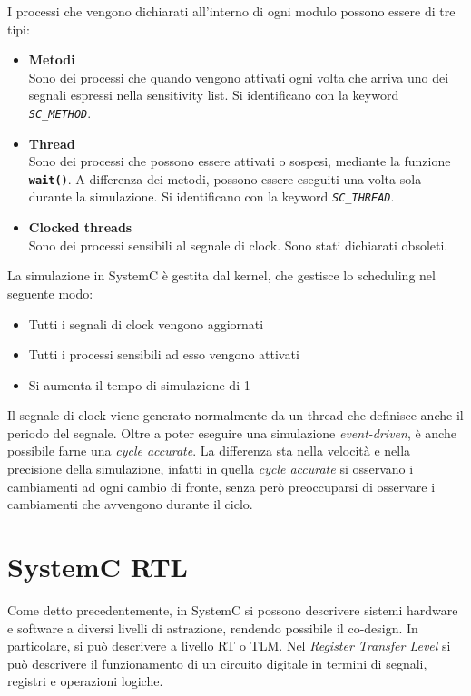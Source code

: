 \documentclass[10pt,a4paper,oneside]{scrbook}
\begin{document}
I processi che vengono dichiarati all'interno di ogni modulo possono essere di tre tipi:
\begin{itemize}
    \item \textbf{Metodi}\\
    Sono dei processi che quando vengono attivati ogni volta che arriva uno dei segnali espressi nella sensitivity list.
    Si identificano con la keyword \textit{\texttt{SC\_METHOD}}.
    \item \textbf{Thread}\\
    Sono dei processi che possono essere attivati o sospesi, mediante la funzione \textbf{\texttt{wait()}}.
    A differenza dei metodi, possono essere eseguiti una volta sola durante la simulazione.
    Si identificano con la keyword \textit{\texttt{SC\_THREAD}}.
    \item \textbf{Clocked threads}\\
    Sono dei processi sensibili al segnale di clock. Sono stati dichiarati obsoleti.
\end{itemize}
La simulazione in SystemC è gestita dal kernel, che gestisce lo scheduling nel seguente modo:
\begin{itemize}[label={$\Rightarrow$}]
    \item Tutti i segnali di clock vengono aggiornati
    \item Tutti i processi sensibili ad esso vengono attivati
    \item Si aumenta il tempo di simulazione di 1
\end{itemize}
Il segnale di clock viene generato normalmente da un thread che definisce anche il periodo del segnale.
Oltre a poter eseguire una simulazione \textit{event-driven}, è anche possibile farne una \textit{cycle accurate}.
La differenza sta nella velocità e nella precisione della simulazione, infatti in quella \textit{cycle accurate} si
osservano i cambiamenti ad ogni cambio di fronte, senza però preoccuparsi di osservare i cambiamenti che avvengono
durante il ciclo.
\section{SystemC RTL}
Come detto precedentemente, in SystemC si possono descrivere sistemi hardware e software a diversi livelli di astrazione,
rendendo possibile il co-design. In particolare, si può descrivere a livello RT o TLM.
Nel \textit{Register Transfer Level} si può descrivere il funzionamento di un circuito digitale in termini di segnali,
registri e operazioni logiche.
\end{document}
